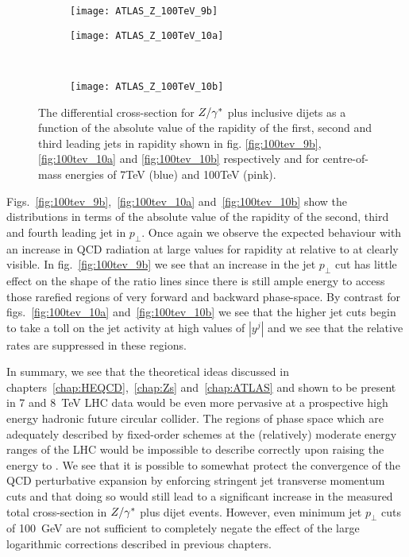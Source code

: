 	\begin{figure}[bth]
		\centering
		\begin{subfigure}[b]{0.48\textwidth}
			\texttt{[image: ATLAS\_Z\_100TeV\_9b]}
			\caption{}
			\label{fig:100tev_9b}
		\end{subfigure}

		\begin{subfigure}[b]{0.48\textwidth}
			\texttt{[image: ATLAS\_Z\_100TeV\_10a]}
			\caption{}
			\label{fig:100tev_10a}
		\end{subfigure}
		~
		\begin{subfigure}[b]{0.48\textwidth}
			\texttt{[image: ATLAS\_Z\_100TeV\_10b]}
			\caption{}
			\label{fig:100tev_10b}
		\end{subfigure}
		\caption{The differential cross-section for $Z/\gamma^*$ plus inclusive dijets as a function of the absolute value of the rapidity
		         of the first, second and third leading jets in rapidity shown in fig. \eqref{fig:100tev_9b}, \eqref{fig:100tev_10a}
		         and \eqref{fig:100tev_10b} respectively and for centre-of-mass energies of 7TeV (blue) and 100TeV (pink).}
	\end{figure}

	Figs.~\eqref{fig:100tev_9b},~\eqref{fig:100tev_10a} and~\eqref{fig:100tev_10b} show the distributions in terms of
	the absolute value of the rapidity of the second, third and fourth leading jet in $p_\perp$.  Once again we observe
	the expected behaviour with an increase in QCD radiation at large values for rapidity at \htev relative to at \stev
	clearly visible.  In fig.~\eqref{fig:100tev_9b} we see that an increase in the jet $p_\perp$ cut has little effect
	on the shape of the ratio lines since there is still ample energy to access those rarefied regions of very forward
	and backward phase-space.  By contrast for figs.~\eqref{fig:100tev_10a} and~\eqref{fig:100tev_10b} we see that the
	higher jet cuts begin to take a toll on the jet activity at high values of $|y^j|$ and we see that the relative
	rates are suppressed in these regions.

	In summary, we see that the theoretical ideas discussed in chapters~\ref{chap:HEQCD},~\ref{chap:Zs} and~\ref{chap:ATLAS}
	and shown to be present in 7 and 8~TeV LHC data would be even more pervasive at a prospective high energy hadronic
	future circular collider.  The regions of phase space which are adequately described by fixed-order schemes at
	the (relatively) moderate energy ranges of the LHC would be impossible to describe correctly upon raising the energy
	to \htev.  We see that it is possible to somewhat protect the convergence of the QCD perturbative expansion by enforcing
	stringent jet transverse momentum cuts and that doing so would still lead to a significant increase in the measured
	total cross-section in $Z/\gamma^*$ plus dijet events.  However, even minimum jet $p_\perp$ cuts of 100~GeV are not sufficient
	to completely negate the effect of the large logarithmic corrections described in previous chapters.

